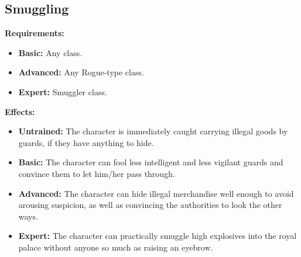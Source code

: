 \documentclass[openany,10pt,a4paper]{book}
\begin{document}
\subsection{Smuggling}
\begin{table}[!ht]
\centering
{}
\end{table}
\textbf{Requirements:}
\begin{itemize}
	\item \textbf{Basic:} Any class.
	\item \textbf{Advanced:} Any Rogue-type class.
	\item \textbf{Expert:} Smuggler class.
\end{itemize}
\textbf{Effects:}
\begin{itemize}
	\item \textbf{Untrained:} The character is immediately caught carrying illegal goods by guards, if they have anything to hide.
	\item \textbf{Basic:} The character can fool less intelligent and less vigilant guards and convince them to let him/her pass through.
	\item \textbf{Advanced:} The character can hide illegal merchandise well enough to avoid arousing suspicion, as well as convincing the authorities to look the other ways.
	\item \textbf{Expert:} The character can practically smuggle high explosives into the royal palace without anyone so much as raising an eyebrow.
\end{itemize}\newpage
\end{document}
